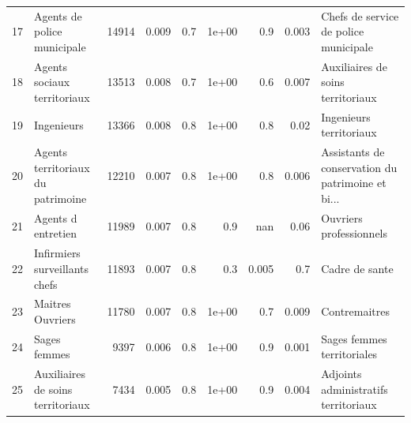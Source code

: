 \documentclass[11pt,a4paper]{article}
\begin{document}
\begin{tabular}{llrrrrrrl}
	17  &                        Agents de police municipale &          14914 &          0.009 &                    0.7 &              1e+00 &                               0.9 &                                    0.003 &              Chefs de service de police municipale \\
	18  &                        Agents sociaux territoriaux &          13513 &          0.008 &                    0.7 &              1e+00 &                               0.6 &                                    0.007 &                  Auxiliaires de soins territoriaux \\
	19  &                                         Ingenieurs &          13366 &          0.008 &                    0.8 &              1e+00 &                               0.8 &                                     0.02 &                            Ingenieurs territoriaux \\
	20  &                  Agents territoriaux du patrimoine &          12210 &          0.007 &                    0.8 &              1e+00 &                               0.8 &                                    0.006 &  Assistants de conservation du patrimoine et bi... \\
	21  &                                 Agents d entretien &          11989 &          0.007 &                    0.8 &                0.9 &                               nan &                                     0.06 &                            Ouvriers professionnels \\
	22  &                      Infirmiers surveillants chefs &          11893 &          0.007 &                    0.8 &                0.3 &                             0.005 &                                      0.7 &                                     Cadre de sante \\
	23  &                                   Maitres Ouvriers &          11780 &          0.007 &                    0.8 &              1e+00 &                               0.7 &                                    0.009 &                                      Contremaitres \\
	24  &                                       Sages femmes &           9397 &          0.006 &                    0.8 &              1e+00 &                               0.9 &                                    0.001 &                         Sages femmes territoriales \\
	25  &                  Auxiliaires de soins territoriaux &           7434 &          0.005 &                    0.8 &              1e+00 &                               0.9 &                                    0.004 &               Adjoints administratifs territoriaux \\

\end{tabular}
\end{document}
